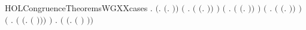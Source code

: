 \begin{SaveVerbatim}{HOLCongruenceTheoremsWGXXcases}
\HOLTokenTurnstile{} \HOLSymConst{\HOLTokenForall{}}.
         \HOLSymConst{\HOLTokenEquiv{}}
       \ensuremath{(}\HOLSymConst{\HOLTokenExists{}}.  \HOLSymConst{\ensuremath{=}} \ensuremath{(}\HOLTokenLambda{}. \ensuremath{)}\ensuremath{)} \HOLSymConst{\HOLTokenDisj{}}
       \ensuremath{(}\HOLSymConst{\HOLTokenExists{}} . \ensuremath{(} \HOLSymConst{\ensuremath{=}} \ensuremath{(}\HOLTokenLambda{}. \HOLSymConst{\ensuremath{\ldotp}} \ensuremath{)}\ensuremath{)} \HOLSymConst{\HOLTokenConj{}}  \ensuremath{)} \HOLSymConst{\HOLTokenDisj{}}
       \ensuremath{(}\HOLSymConst{\HOLTokenExists{}} . \ensuremath{(} \HOLSymConst{\ensuremath{=}} \ensuremath{(}\HOLTokenLambda{}.   \HOLSymConst{\ensuremath{+}}  \ensuremath{)}\ensuremath{)} \HOLSymConst{\HOLTokenConj{}}   \HOLSymConst{\HOLTokenConj{}}  \ensuremath{)} \HOLSymConst{\HOLTokenDisj{}}
       \ensuremath{(}\HOLSymConst{\HOLTokenExists{}} . \ensuremath{(} \HOLSymConst{\ensuremath{=}} \ensuremath{(}\HOLTokenLambda{}.   \HOLSymConst{\ensuremath{\mid}}  \ensuremath{)}\ensuremath{)} \HOLSymConst{\HOLTokenConj{}}   \HOLSymConst{\HOLTokenConj{}}  \ensuremath{)} \HOLSymConst{\HOLTokenDisj{}}
       \ensuremath{(}\HOLSymConst{\HOLTokenExists{}} . \ensuremath{(} \HOLSymConst{\ensuremath{=}} \ensuremath{(}\HOLTokenLambda{}.   \ensuremath{(} \ensuremath{)}\ensuremath{)}\ensuremath{)} \HOLSymConst{\HOLTokenConj{}}  \ensuremath{)} \HOLSymConst{\HOLTokenDisj{}}
       \HOLSymConst{\HOLTokenExists{}} . \ensuremath{(} \HOLSymConst{\ensuremath{=}} \ensuremath{(}\HOLTokenLambda{}.  \ensuremath{(} \ensuremath{)} \ensuremath{)}\ensuremath{)} \HOLSymConst{\HOLTokenConj{}}  
\end{SaveVerbatim}
